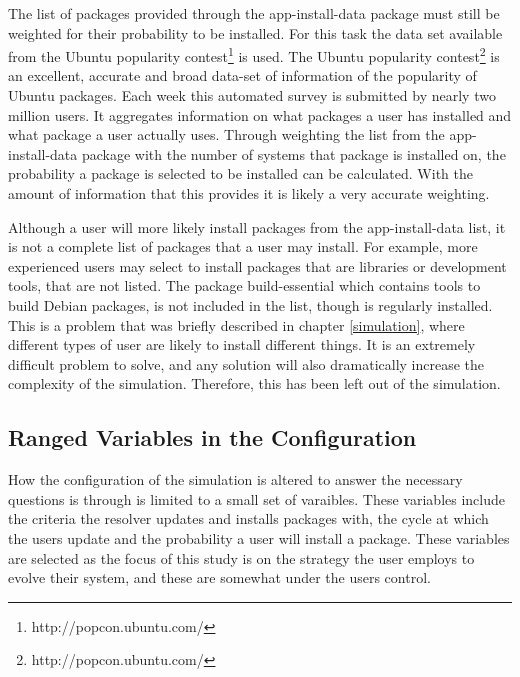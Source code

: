 The list of packages provided through the app-install-data package must still be weighted for their probability to be installed.
For this task the data set available from the Ubuntu popularity contest\footnote{http://popcon.ubuntu.com/} is used.
The Ubuntu popularity contest\footnote{http://popcon.ubuntu.com/} is an excellent, accurate and broad data-set of information of the popularity of Ubuntu packages.
Each week this automated survey is submitted by nearly two million users.
It aggregates information on what packages a user has installed and what package a user actually uses.
Through weighting the list from the app-install-data package with the number of systems that package is installed on,
the probability a package is selected to be installed can be calculated.
With the amount of information that this provides it is likely a very accurate weighting.

Although a user will more likely install packages from the app-install-data list, it is not a complete list of packages that a user may install. 
For example, more experienced users may select to install packages that are libraries or development tools, that are not listed.
The package build-essential which contains tools to build Debian packages, is not included in the list, though is regularly installed.
This is a problem that was briefly described in chapter \ref{simulation}, where different types of user are likely to install different things.
It is an extremely difficult problem to solve, and any solution will also dramatically increase the complexity of the simulation.
Therefore, this has been left out of the simulation. 

\subsection{Ranged Variables in the Configuration}
How the configuration of the simulation is altered to answer the necessary questions is through is limited to a small set of varaibles.
These variables include the criteria the resolver updates and installs packages with,
the cycle at which the users update and the probability a user will install a package.
These variables are selected as the focus of this study is on the strategy the user employs to evolve their system,
and these are somewhat under the users control.

